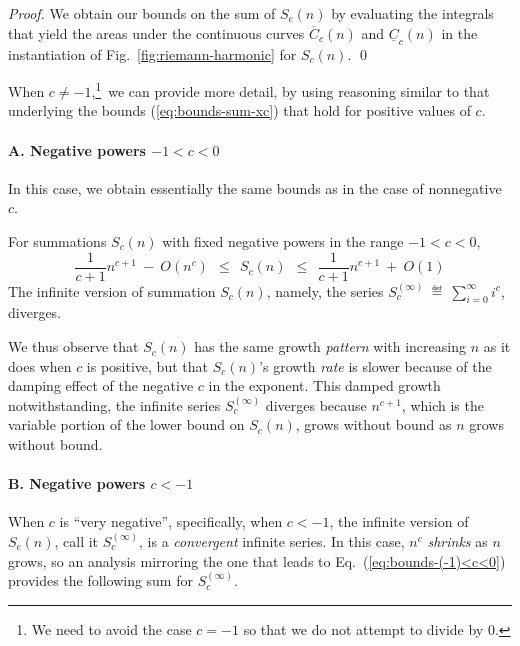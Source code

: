 \begin{proof}
We obtain our bounds on the sum of $S_c(n)$ by evaluating the integrals that yield the areas
under the continuous curves $\overline{C}_c(n)$ and $ \underline{C}_c(n)$ in the instantiation of Fig.~\ref{fig:riemann-harmonic} for $S_c(n)$.  \qed
\end{proof}

When $c \neq -1$,\footnote{We need to avoid the case $c = -1$ so that we do not attempt to divide by $0$.}~we can provide more detail, by using reasoning similar to that underlying the bounds (\ref{eq:bounds-sum-xc}) that hold for positive values of $c$.

\paragraph{A. Negative powers $-1 < c < 0$}

In this case, we obtain essentially the same bounds as in the case of nonnegative $c$.

\begin{prop}
\label{thm:bounds-(-1)<c<0}
For summations $S_c(n)$ with fixed negative powers in the range $-1 < c<0$,
\begin{equation}
\label{eq:bounds-(-1)<c<0}
 \frac{1}{c+1} n^{c+1} \ - \ O(n^c)
  \ \ \leq \ \ S_c(n)
  \ \ \leq \ \
\frac{1}{c+1} n^{c+1} \ + \ O(1)
\end{equation}
The infinite version of summation $S_c(n)$, namely, the series
$\displaystyle S_c^{(\infty)} \ \eqdef \ \sum_{i=0}^\infty i^c$,
diverges.
\end{prop}

We thus observe that $S_c(n)$ has the same growth {\em pattern} with increasing $n$ as it does when $c$ is positive, but that $S_c(n)$'s growth {\em rate} is slower because of the damping effect of the negative $c$ in the exponent.  This damped growth notwithstanding, the infinite series $S_c^{(\infty)}$ diverges because $n^{c+1}$, which is the variable portion of the lower bound on $S_c(n)$, grows without bound as $n$ grows without bound.

\paragraph{B. Negative powers $c < -1$}

When $c$ is ``very negative'', specifically, when $c < -1$, the infinite version of $S_c(n)$, call it $S_c^{(\infty)}$, is a {\em convergent} infinite series.  In this case, $n^c$ {\em shrinks} as $n$ grows, so an analysis mirroring the one that leads to Eq.~(\ref{eq:bounds-(-1)<c<0}) provides the following sum for $S_c^{(\infty)}$.

